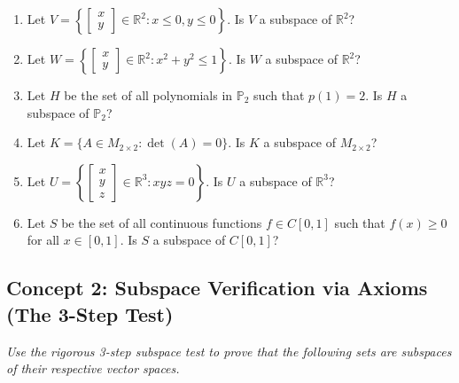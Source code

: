 \documentclass[11pt]{article}
\begin{document}
\begin{enumerate}
    \item Let $V = \left\{ \begin{bmatrix} x \\ y \end{bmatrix} \in \mathbb{R}^2 : x \le 0, y \le 0 \right\}$. Is $V$ a subspace of $\mathbb{R}^2$?
    \item Let $W = \left\{ \begin{bmatrix} x \\ y \end{bmatrix} \in \mathbb{R}^2 : x^2 + y^2 \le 1 \right\}$. Is $W$ a subspace of $\mathbb{R}^2$?
    \item Let $H$ be the set of all polynomials in $\mathbb{P}_2$ such that $p(1) = 2$. Is $H$ a subspace of $\mathbb{P}_2$?
    \item Let $K = \{A \in M_{2\times 2} : \det(A) = 0\}$. Is $K$ a subspace of $M_{2\times 2}$?
    \item Let $U = \left\{ \begin{bmatrix} x \\ y \\ z \end{bmatrix} \in \mathbb{R}^3 : xyz = 0 \right\}$. Is $U$ a subspace of $\mathbb{R}^3$?
    \item Let $S$ be the set of all continuous functions $f \in C[0,1]$ such that $f(x) \ge 0$ for all $x \in [0,1]$. Is $S$ a subspace of $C[0,1]$?
\end{enumerate}

\subsection*{Concept 2: Subspace Verification via Axioms (The 3-Step Test)}
\textit{Use the rigorous 3-step subspace test to prove that the following sets are subspaces of their respective vector spaces.}
\end{document}
